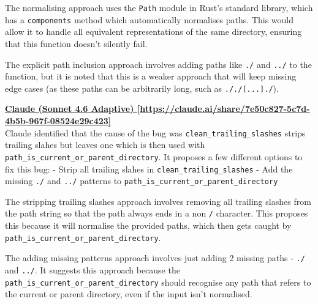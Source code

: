 \documentclass[titlepage]{article}
\begin{document}
        The normalising approach uses the \texttt{Path} module in Rust's
        standard library, which has a \texttt{components} method which
        automatically normalises paths. This would allow it to handle all
        equivalent representations of the same directory, ensuring that this
        function doesn't silently fail.
        
        \vspace{0.5em}

        The explicit path inclusion approach involves adding paths like
        \texttt{./} and \texttt{../} to the function, but it is noted that this
        is a weaker approach that will keep missing edge cases (as these paths
        can be arbitrarily long, such as \texttt{././{[}...{]}./}).

        \bigskip

        \textbf{\href{https://claude.ai/share/7e50c827-5c7d-4b5b-967f-08524e29c423}{Claude (Sonnet 4.6 Adaptive) [https://claude.ai/share/7e50c827-5c7d-4b5b-967f-08524e29c423]}} \\
        Claude identified that the cause of the bug was
        \texttt{clean\_trailing\_slashes} strips trailing slahes but leaves one
        which is then used with
        \texttt{path\_is\_current\_or\_parent\_directory}. It proposes a few
        different options to fix this bug: - Strip all trailing slahes in
        \texttt{clean\_trailing\_slashes} - Add the missing \texttt{./} and
        \texttt{../} patterns to
        \texttt{path\_is\_current\_or\_parent\_directory}
        
        \vspace{0.5em}

        The stripping trailing slashes approach involves removing all trailing
        slashes from the path string so that the path always ends in a non
        \texttt{/} character. This proposes this because it will normalise the
        provided paths, which then gets caught by
        \texttt{path\_is\_current\_or\_parent\_directory}.
        
        \vspace{0.5em}

        The adding missing patterns approach involves just adding 2 missing
        paths - \texttt{./} and \texttt{../}. It suggests this approach because
        the \texttt{path\_is\_current\_or\_parent\_directory} should recognise
        any path that refers to the current or parent directory, even if the
        input isn't normalised.
        
\end{document}
